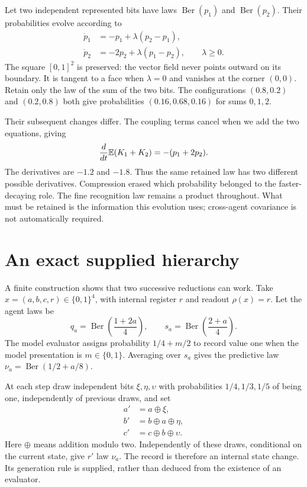 Let two independent represented bits have laws
$\operatorname{Ber}(p_1)$ and $\operatorname{Ber}(p_2)$. Their probabilities
evolve according to
\begin{equation}
 \begin{aligned}
 \dot p_1&=-p_1+\lambda(p_2-p_1),\\
 \dot p_2&=-2p_2+\lambda(p_1-p_2),\qquad \lambda\geq0.
 \end{aligned}
\end{equation}
The square $[0,1]^2$ is preserved: the vector field never points outward
on its boundary. It is tangent to a face when $\lambda=0$ and vanishes at the
corner $(0,0)$. Retain only the law of the sum of the two bits. The configurations
$(0.8,0.2)$ and $(0.2,0.8)$ both give probabilities
$(0.16,0.68,0.16)$ for sums $0,1,2$.

Their subsequent changes differ. The coupling terms cancel when we add the
two equations, giving
\begin{equation}
 \frac{d}{dt}\mathbb E(K_1+K_2)=-(p_1+2p_2).
\end{equation}
The derivatives are $-1.2$ and $-1.8$. Thus the same retained law has two
different possible derivatives. Compression erased which probability belonged
to the faster-decaying role. The fine recognition law remains a product
throughout. What must be retained is the information this evolution uses;
cross-agent covariance is not automatically required.

\section{An exact supplied hierarchy}

A finite construction shows that two successive reductions can work. Take
$x=(a,b,c,r)\in\{0,1\}^4$, with internal register $r$ and readout
$\rho(x)=r$. Let the agent laws be
\begin{equation}
 q_a=\operatorname{Ber}\left(\frac{1+2a}{4}\right),\qquad
 s_a=\operatorname{Ber}\left(\frac{2+a}{4}\right).
\end{equation}
The model evaluator assigns probability $1/4+m/2$ to record value one
when the model presentation is $m\in\{0,1\}$. Averaging over $s_a$
gives the predictive law $\nu_a=\operatorname{Ber}(1/2+a/8)$.

At each step draw independent bits $\xi,\eta,\upsilon$ with probabilities
$1/4,1/3,1/5$ of being one, independently of previous draws, and set
\begin{equation}
 \begin{aligned}
 a'&=a\mathbin\oplus\xi,\\
 b'&=b\mathbin\oplus a\mathbin\oplus\eta,\\
 c'&=c\mathbin\oplus b\mathbin\oplus\upsilon.
 \end{aligned}
\end{equation}
Here $\oplus$ means addition modulo two. Independently of these draws,
conditional on the current state, give $r'$ law $\nu_a$. The record is
therefore an internal state change. Its generation rule is supplied, rather
than deduced from the existence of an evaluator.

